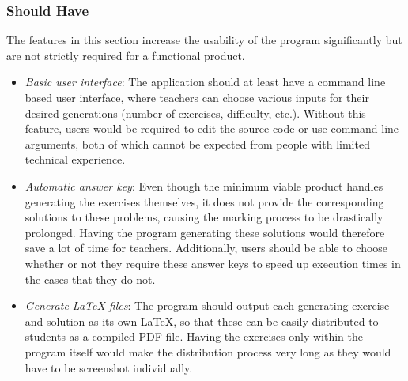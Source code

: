 \documentclass{l4proj}
\begin{document}
\subsubsection{Should Have}
The features in this section increase the usability of the program significantly but are not strictly required for a functional product.
\begin{itemize}
	\item
	\emph{Basic user interface}: The application should at least have a command line based user interface, where teachers can choose various inputs for their desired generations (number of exercises, difficulty, etc.). Without this feature, users would be required to edit the source code or use command line arguments, both of which cannot be expected from people with limited technical experience. 
	\item
	\emph{Automatic answer key}: Even though the minimum viable product handles generating the exercises themselves,  it does not provide the corresponding solutions to these problems, causing the marking process to be drastically prolonged. Having the program generating these solutions would therefore save a lot of time for teachers. Additionally, users should be able to choose whether or not they require these answer keys to speed up execution times in the cases that they do not.
	\item
	\emph{Generate LaTeX files}: The program should output each generating exercise and solution as its own LaTeX, so that these can be easily distributed to students as a compiled PDF file. Having the exercises only within the program itself would make the distribution process very long as they would have to be screenshot individually.
\end{itemize}
\end{document}
